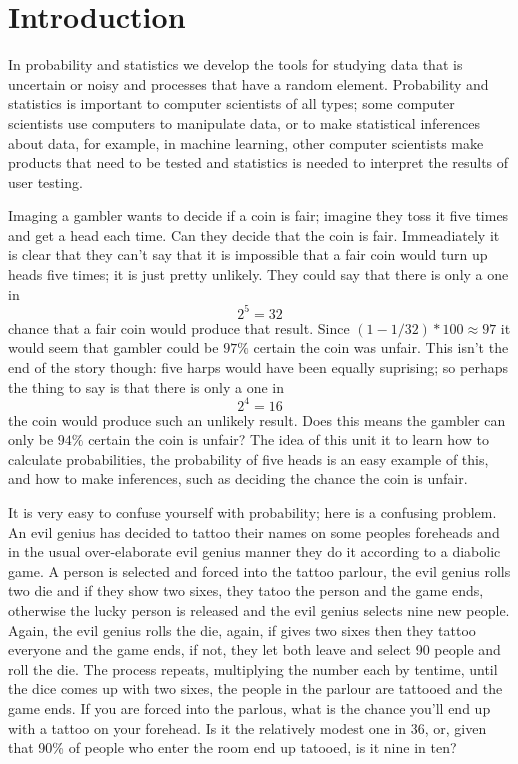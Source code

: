 \documentclass[11pt,a4paper]{scrartcl}
\begin{document}
\section*{Introduction}

In probability and statistics we develop the tools for studying data
that is uncertain or noisy and processes that have a random
element. Probability and statistics is important to computer
scientists of all types; some computer scientists use computers to
manipulate data, or to make statistical inferences about data, for
example, in machine learning, other computer scientists make products
that need to be tested and statistics is needed to interpret the
results of user testing.

Imaging a gambler wants to decide if a coin is fair; imagine they toss
it five times and get a head each time. Can they decide that the coin is
fair. Immeadiately it is clear that they can't say that it is
impossible that a fair coin would turn up heads five times; it is just
pretty unlikely. They could say that there is only a one in
\begin{equation}
2^{5}=32
\end{equation}
chance that a fair coin would produce that result. Since
$(1-1/32)*100\approx 97$ it would seem that gambler could be $97\%$
certain the coin was unfair. This isn't the end of the story though:
five harps would have been equally suprising; so perhaps the thing to
say is that there is only a one in
\begin{equation}
2^{4}=16
\end{equation}
the coin would produce such an unlikely result. Does this means the
gambler can only be $94\%$ certain the coin is unfair? The idea of
this unit it to learn how to calculate probabilities, the probability
of five heads is an easy example of this, and how to make inferences,
such as deciding the chance the coin is unfair.


It is very easy to confuse yourself with probability; here is a
confusing problem. An evil genius has decided to tattoo their names on
some peoples foreheads and in the usual over-elaborate evil genius
manner they do it according to a diabolic game. A person is selected
and forced into the tattoo parlour, the evil genius rolls two die and
if they show two sixes, they tatoo the person and the game ends,
otherwise the lucky person is released and the evil genius selects
nine new people. Again, the evil genius rolls the die, again, if gives
two sixes then they tattoo everyone and the game ends, if not, they
let both leave and select 90 people and roll the die. The process
repeats, multiplying the number each by tentime, until the dice comes
up with two sixes, the people in the parlour are tattooed and the game
ends. If you are forced into the parlous, what is the chance you'll
end up with a tattoo on your forehead. Is it the relatively modest one
in 36, or, given that 90\% of people who enter the room end up
tatooed, is it nine in ten?
\end{document}
